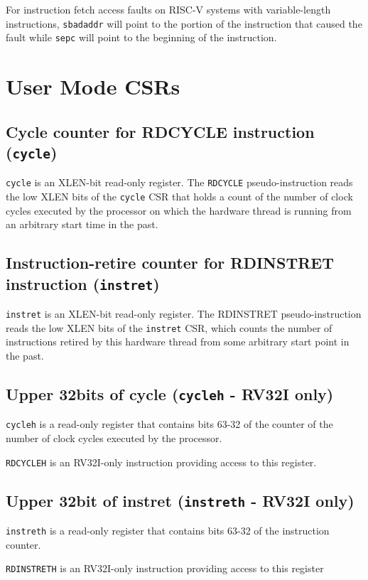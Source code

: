 For instruction fetch access faults on RISC-V systems with
variable-length instructions, {\tt sbadaddr} will point to the portion of the
instruction that caused the fault while {\tt sepc} will point to the beginning
of the instruction.

\pagebreak

\section{User Mode CSRs}\label{user-mode-csrs}

\subsection{Cycle counter for RDCYCLE instruction
({\tt cycle})}\label{cycle-counter-for-rdcycle-instruction-cycle}

{\tt cycle} is an XLEN-bit read-only register. The {\tt RDCYCLE} pseudo-instruction
reads the low XLEN bits of the {\tt cycle} CSR that holds a count of the
number of clock cycles executed by the processor on which the hardware
thread is running from an arbitrary start time in the past.

\subsection{Instruction-retire counter for RDINSTRET instruction
({\tt instret})}\label{instruction-retire-counter-for-rdinstret-instruction-instret}

{\tt instret} is an XLEN-bit read-only register. The RDINSTRET
pseudo-instruction reads the low XLEN bits of the {\tt instret} CSR, which
counts the number of instructions retired by this hardware thread from
some arbitrary start point in the past.

\subsection{Upper 32bits of cycle ({\tt cycleh} - RV32I
only)}\label{upper-32bits-of-cycle-cycleh---rv32i-only}

{\tt cycleh} is a read-only register that contains bits 63-32 of the counter
of the number of clock cycles executed by the processor.

{\tt RDCYCLEH} is an RV32I-only instruction providing access to this register.

\subsection{Upper 32bit of instret ({\tt instreth} - RV32I
only)}\label{upper-32bit-of-instret-instreth---rv32i-only}

{\tt instreth} is a read-only register that contains bits 63-32 of the
instruction counter.

{\tt RDINSTRETH} is an RV32I-only instruction providing access to this
register